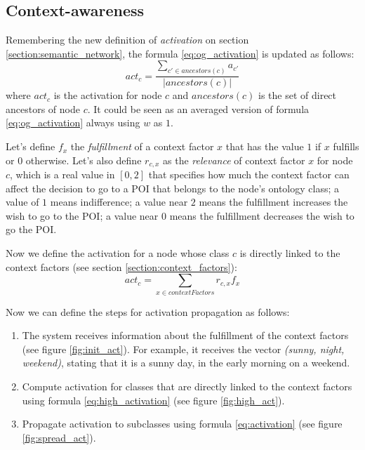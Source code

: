 \subsection{Context-awareness} \label{section:context-awareness}
Remembering the new definition of \textit{activation} on section \ref{section:semantic_network}, the formula \ref{eq:og_activation} is updated as follows:
\begin{equation} \label{eq:activation}
    act_c = \frac{\displaystyle \sum_{c' \in ancestors(c)} a_{c'}}{|ancestors(c)|}
\end{equation}
where $act_c$ is the activation for node $c$ and $ancestors(c)$ is the set of direct ancestors of node $c$. It could be seen as an averaged version of formula \ref{eq:og_activation} always using $w$ as $1$.

Let's define $f_x$ the \textit{fulfillment} of a context factor $x$ that has the value $1$ if $x$ fulfills or $0$ otherwise. Let's also define $r_{c,x}$ as the \textit{relevance} of context factor $x$ for node $c$, which is a real value in $[0, 2]$ that specifies how much the context factor can affect the decision to go to a POI that belongs to the node's ontology class; a value of $1$ means indifference; a value near $2$ means the fulfillment increases the wish to go to the POI; a value near $0$ means the fulfillment decreases the wish to go the POI. 

Now we define the activation for a node whose class $c$ is directly linked to the context factors (see section \ref{section:context_factors}):
\begin{equation} \label{eq:high_activation}
    act_c = \sum_{x \in contextFactors} r_{c,x} f_x
\end{equation}

Now we can define the steps for activation propagation as follows:
\begin{enumerate}
    \item The system receives information about the fulfillment of the context factors (see figure \ref{fig:init_act}). For example, it receives the vector \textit{(sunny, night, weekend)}, stating that it is a sunny day, in the early morning on a weekend.
    
    \item Compute activation for classes that are directly linked to the context factors using formula \ref{eq:high_activation} (see figure \ref{fig:high_act}).
    
    \item Propagate activation to subclasses using formula \ref{eq:activation} (see figure \ref{fig:spread_act}).
\end{enumerate}

